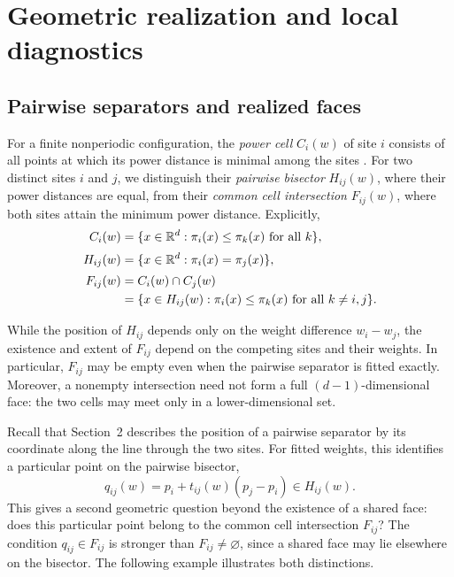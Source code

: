 \section{Geometric realization and local diagnostics}
\label{sec:geometric-realization}


\subsection{Pairwise separators and realized faces}
\label{subsec:faces}

For a finite nonperiodic configuration, the \emph{power cell} $C_i(w)$ of site $i$ consists of all points at which its power distance is minimal among the sites \citep{Aurenhammer1987}. For two distinct sites $i$ and $j$, we distinguish their \emph{pairwise bisector} $H_{ij}(w)$, where their power distances are equal, from their \emph{common cell intersection} $F_{ij}(w)$, where both sites attain the minimum power distance. Explicitly,
\begin{align}
C_i(w)&=\{x\in\mathbb R^d:\pi_i(x)\le\pi_k(x)
\text{ for all }k\}, \label{eq:power-cell}\\[2pt]
H_{ij}(w)&=\{x\in\mathbb R^d:\pi_i(x)=\pi_j(x)\}, \label{eq:pair-bisector}\\[2pt]
F_{ij}(w)&=C_i(w)\cap C_j(w)\notag\\
&=\{x\in H_{ij}(w):
\pi_i(x)\le\pi_k(x)
\text{ for all }k\ne i,j\}. \label{eq:common-cell-intersection}
\end{align}

While the position of $H_{ij}$ depends only on the weight difference $w_i-w_j$, the existence and extent of $F_{ij}$ depend on the competing sites and their weights. In particular, $F_{ij}$ may be empty even when the pairwise separator is fitted exactly. Moreover, a nonempty intersection need not form a full $(d-1)$-dimensional face: the two cells may meet only in a lower-dimensional set.

Recall that Section~2 describes the position of a pairwise separator by its coordinate along the line through the two sites. For fitted weights, this identifies a particular point on the pairwise bisector,
\begin{equation}
q_{ij}(w)=p_i+t_{ij}(w)(p_j-p_i)\in H_{ij}(w).
\label{eq:connector-point}
\end{equation}
This gives a second geometric question beyond the existence of a shared face: does this particular point belong to the common cell intersection $F_{ij}$? The condition $q_{ij}\in F_{ij}$ is stronger than $F_{ij}\ne\varnothing$, since a shared face may lie elsewhere on the bisector. The following example illustrates both distinctions.

